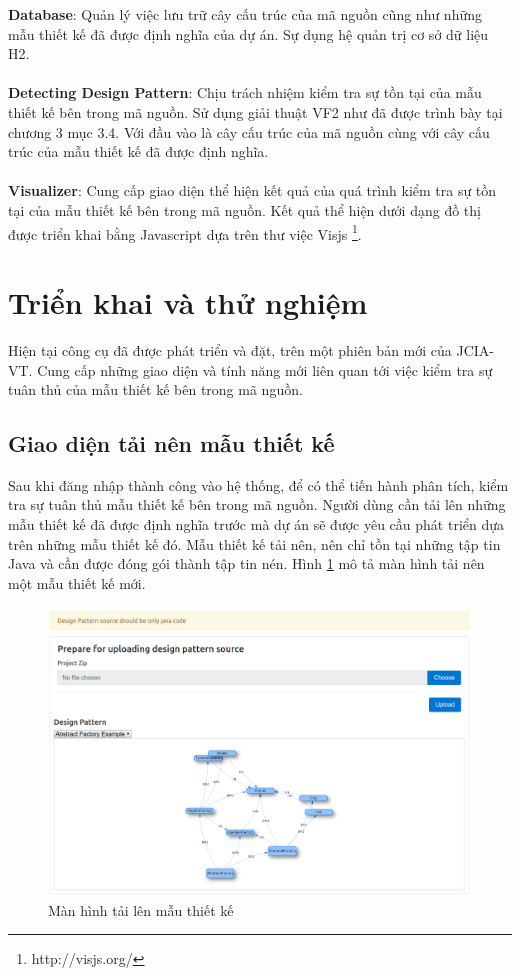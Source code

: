 \documentclass[12pt]{report}
\begin{document}
\noindent \textbf{Database}: Quản lý việc lưu trữ cây cấu trúc của mã nguồn cũng như những mẫu thiết kế đã được định nghĩa của dự án. Sự dụng hệ quản trị cơ sở dữ liệu H2.\\\\
\noindent \textbf{Detecting Design Pattern}: Chịu trách nhiệm kiểm tra sự tồn tại của mẫu thiết kế bên trong mã nguồn. Sử dụng giải thuật VF2 như đã được trình bày tại chương 3 mục 3.4. Với đầu vào là cây cấu trúc của mã nguồn cùng với cây cấu trúc của mẫu thiết kế đã được định nghĩa.\\\\
\noindent \textbf{Visualizer}: Cung cấp giao diện thể hiện kết quả của quá trình kiểm tra sự tồn tại của mẫu thiết kế bên trong mã nguồn. Kết quả thể hiện dưới dạng đồ thị được triển khai bằng Javascript dựa trên thư việc Visjs \footnote{http://visjs.org/}.
\newpage
\section{Triển khai và thử nghiệm}
Hiện tại công cụ đã được phát triển và đặt, trên một phiên bản mới của JCIA-VT. Cung cấp những giao diện và tính năng mới liên quan tới việc kiểm tra sự tuân thủ của mẫu thiết kế bên trong mã nguồn.
\subsection{Giao diện tải nên mẫu thiết kế}
Sau khi đăng nhập thành công vào hệ thống, để có thể tiến hành phân tích, kiểm tra sự tuân thủ mẫu thiết kế bên trong mã nguồn. Người dùng cần tải lên những mẫu thiết kế đã được định nghĩa trước mà dự án sẽ được yêu cầu phát triển dựa trên những mẫu thiết kế đó. Mẫu thiết kế tải nên, nên chỉ tồn tại những tập tin Java và cần được đóng gói thành tập tin nén. Hình \ref{fig:ds_upload_example} mô tả màn hình tải nên một mẫu thiết kế mới.
\begin{figure}[h]
	\centering
	\includegraphics[scale=0.4]{images/ds_upload_example}
	\caption{Màn hình tải lên mẫu thiết kế}
	\label{fig:ds_upload_example}
\end{figure}
\end{document}
